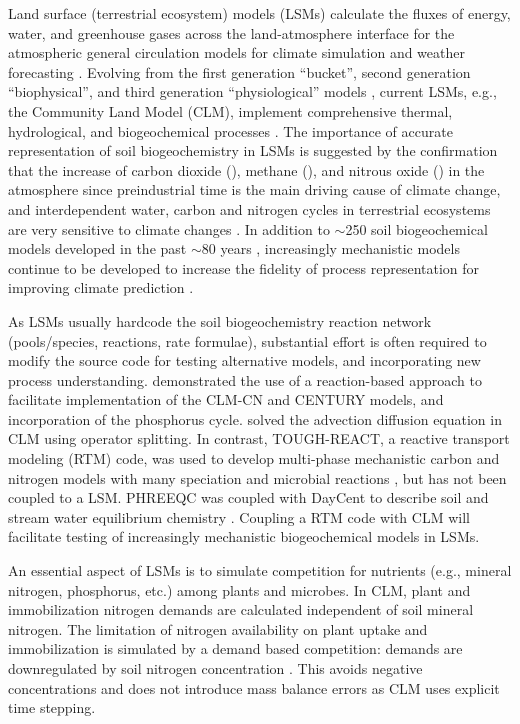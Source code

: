 \documentclass[gmd, manuscript]{copernicus}
\begin{document}
\introduction  %
Land surface (terrestrial ecosystem) models (LSMs) calculate the fluxes of
energy, water, and greenhouse gases across the land-atmosphere interface for
the atmospheric general circulation models for climate simulation and weather
forecasting \citep{Sellers1997}. Evolving from the first generation ``bucket'',
second generation ``biophysical'', and third generation ``physiological''
models \citep{Seneviratne2010}, current LSMs, e.g., the Community Land Model
(CLM), implement comprehensive thermal, hydrological, and biogeochemical
processes \citep{Oleson2013}. The importance of accurate representation of soil biogeochemistry in LSMs is
suggested by the confirmation that the increase of carbon dioxide
(), methane (), and nitrous oxide () in the
atmosphere since preindustrial time is the main driving cause of climate
change, and interdependent water, carbon and nitrogen cycles in terrestrial
ecosystems are very sensitive to climate changes \citep{IPCC2013}. In addition
to $\sim$250 soil biogeochemical models developed in the past $\sim$80 years
\citep{Manzoni2009}, increasingly mechanistic models continue to be developed
to increase the fidelity of process representation for improving
climate prediction \citep[e.g.,][]{Riley2014}. 

As LSMs usually hardcode the soil biogeochemistry reaction network (pools/species, reactions, rate
formulae), substantial effort is often required to modify the source code for
testing alternative models, and incorporating new process
understanding. \citet{Fang2013} demonstrated the use of a reaction-based approach
to facilitate implementation of the CLM-CN and CENTURY models, and incorporation of
the phosphorus cycle.  \citet{Tang2013b} solved the advection diffusion equation in
CLM using operator splitting. In contrast, TOUGH-REACT, a reactive transport
modeling (RTM) code, was used to develop multi-phase mechanistic carbon and
nitrogen models with many speciation and microbial reactions
\citep{Maggi2008,Gu2010,Riley2014}, but has not been coupled to a LSM. PHREEQC
was coupled with DayCent to describe  soil and stream water equilibrium
chemistry  \citep{Hartman2007}. Coupling a RTM code with CLM will facilitate
testing of increasingly mechanistic biogeochemical models in LSMs.

An essential aspect of LSMs is to simulate competition for nutrients (e.g.,
mineral nitrogen, phosphorus, etc.) among plants and microbes. In CLM,  plant
and immobilization nitrogen demands are calculated independent of soil mineral
nitrogen. The limitation of nitrogen availability on plant uptake and
immobilization is simulated by a demand based competition: demands are
downregulated by soil nitrogen concentration \citep{Oleson2013,Thornton2005}.
This avoids negative concentrations and does not introduce mass balance errors
\citep{Tang2015} as CLM uses explicit time stepping. 
\end{document}

